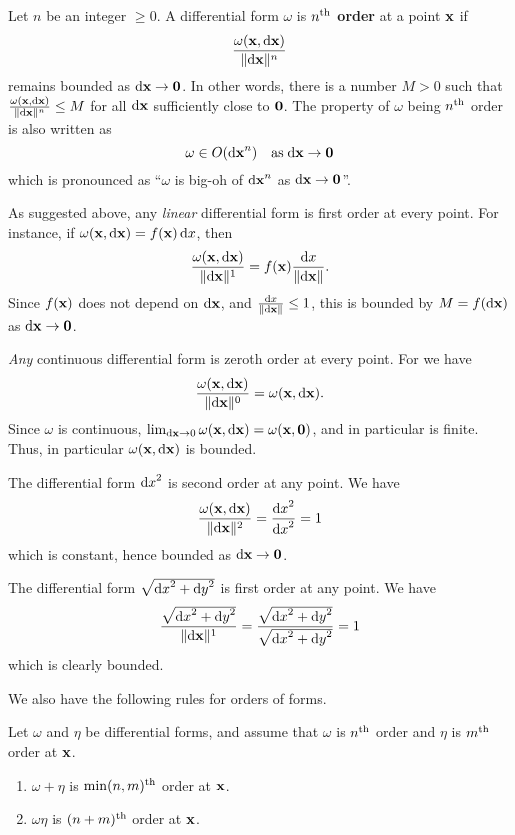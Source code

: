 \documentclass{amsart}
\begin{document}
\begin{defn}\label{def:order}
  Let $n$ be an integer $\ge 0$.
  A differential form $\omega$ is \textbf{$n^{\mathrm{th}}$ order} at a point $\mathbf{x}$ if
  \[ \frac{\omega(\mathbf{x},{\mathrm{d} \mathbf{x}})}{\Vert {\ensuremath{\mathrm{d} \mathbf{x}}} \Vert^n} \]
  remains bounded as ${\mathrm{d} \mathbf{x}}\to\mathbf{0}$.  In other words, there is a number $M>0$ such that
  \( \frac{\omega(\mathbf{x},{\mathrm{d} \mathbf{x}})}{\Vert {\ensuremath{\mathrm{d} \mathbf{x}}} \Vert^n} \le M \)
  for all ${\mathrm{d} \mathbf{x}}$ sufficiently close to $\mathbf{0}$.
  The property of $\omega$ being $n^{\mathrm{th}}$ order is also written as
  \[ \omega \in O({\mathrm{d} \mathbf{x}}^n) \quad\text{as}\;{\mathrm{d} \mathbf{x}}\to\mathbf{0} \]
  which is pronounced as ``$\omega$ is big-oh of ${\mathrm{d} \mathbf{x}}^n$ as ${\mathrm{d} \mathbf{x}}\to\mathbf{0}$''.
\end{defn}

\begin{eg}
  As suggested above, any \emph{linear} differential form is first order at every point.
  For instance, if $\omega(\mathbf{x},\mathrm{d}\mathbf{x}) = f(\mathbf{x}) \, {\mathrm{d} x}$, then
  \[ \frac{\omega(\mathbf{x},{\mathrm{d} \mathbf{x}})}{\Vert {\ensuremath{\mathrm{d} \mathbf{x}}} \Vert^1} = f(\mathbf{x}) \frac{{\mathrm{d} x}}{\Vert {\ensuremath{\mathrm{d} \mathbf{x}}} \Vert}.\]
  Since $f(\mathbf{x})$ does not depend on ${\mathrm{d} \mathbf{x}}$, and $\frac{{\mathrm{d} x}}{\Vert {\ensuremath{\mathrm{d} \mathbf{x}}} \Vert} \le 1$, this is bounded by $M=f({\mathrm{d} \mathbf{x}})$ as ${\mathrm{d} \mathbf{x}}\to\mathbf{0}$.
\end{eg}

\begin{eg}
  \emph{Any} continuous differential form is zeroth order at every point.
  For we have
  \[\frac{\omega(\mathbf{x},{\mathrm{d} \mathbf{x}})}{\Vert {\ensuremath{\mathrm{d} \mathbf{x}}} \Vert^0} = \omega(\mathbf{x},{\mathrm{d} \mathbf{x}}).\]
  Since $\omega$ is continuous, $\lim_{{\mathrm{d} \mathbf{x}}\to 0} \omega(\mathbf{x},{\mathrm{d} \mathbf{x}}) = \omega(\mathbf{x},\mathbf{0})$, and in particular is finite.
  Thus, in particular $\omega(\mathbf{x},{\mathrm{d} \mathbf{x}})$ is bounded.
\end{eg}

\begin{eg}
  The differential form ${\mathrm{d} x}^2$ is second order at any point.
  We have
  \[ \frac{\omega(\mathbf{x},{\mathrm{d} \mathbf{x}})}{\Vert {\ensuremath{\mathrm{d} \mathbf{x}}} \Vert^2} = \frac{{\mathrm{d} x}^2}{{\mathrm{d} x}^2} = 1 \]
  which is constant, hence bounded as ${\mathrm{d} \mathbf{x}}\to\mathbf{0}$.
\end{eg}

\begin{eg}
  The differential form $\sqrt{{\mathrm{d} x}^2+{\mathrm{d} y}^2}$ is first order at any point.
  We have
  \[ \frac{\sqrt{{\mathrm{d} x}^2+{\mathrm{d} y}^2}}{\Vert {\ensuremath{\mathrm{d} \mathbf{x}}} \Vert^1} =
  \frac{\sqrt{{\mathrm{d} x}^2+{\mathrm{d} y}^2}}{\sqrt{{\mathrm{d} x}^2+{\mathrm{d} y}^2}} = 1
  \]
  which is clearly bounded.
\end{eg}

We also have the following rules for orders of forms.

\begin{thm}
  Let $\omega$ and $\eta$ be differential forms, and assume that $\omega$ is $n^{\mathrm{th}}$ order and $\eta$ is $m^{\mathrm{th}}$ order at $\mathbf{x}$.
  \begin{enumerate}
  \item $\omega+\eta$ is $\min(n,m)^{\mathrm{th}}$ order at $\mathbf{x}$.
  \item $\omega\eta$ is $(n+m)^{\mathrm{th}}$ order at $\mathbf{x}$.
  \end{enumerate}
\end{thm}
\end{document}
